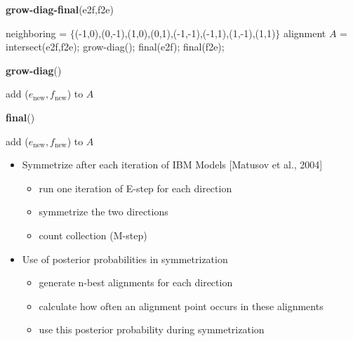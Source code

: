 \documentclass[landscape]{slides}
\begin{document}
\vspace{3mm}
{\footnotesize {\bf grow-diag-final}(e2f,f2e)
\begin{algorithmic}[1]
\STATE neighboring = $\{$(-1,0),(0,-1),(1,0),(0,1),(-1,-1),(-1,1),(1,-1),(1,1)$\}$
\STATE alignment $A$ = intersect(e2f,f2e); grow-diag(); final(e2f); final(f2e);
\end{algorithmic}
{\bf grow-diag}()
\begin{algorithmic}[1]
           \STATE add ($e_\text{new},f_\text{new}$) to $A$
        \ENDIF
       \ENDFOR  
  \ENDFOR  
\ENDWHILE
\end{algorithmic}
{\bf final}()
\begin{algorithmic}[1]
       \STATE add ($e_\text{new},f_\text{new}$) to $A$
     \ENDIF
\ENDFOR  
\end{algorithmic}
}

 
\vspace{15mm}
\begin{itemize}
\item Symmetrize after each iteration of IBM Models [Matusov et al., 2004]
\begin{itemize}
\item run one iteration of E-step for each direction
\item symmetrize the two directions
\item count collection (M-step)
\end{itemize}
\vspace{5mm}
\item Use of posterior probabilities in symmetrization 
\begin{itemize}
\item generate n-best alignments for each direction
\item calculate how often an alignment point occurs in these alignments
\item use this posterior probability during symmetrization
\end{itemize}
\end{itemize}
\end{document}
